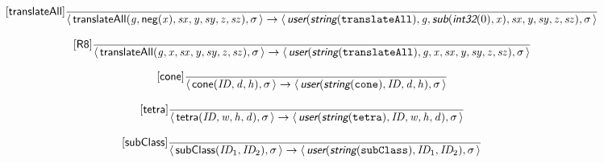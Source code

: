 \documentclass[10pt,leqno]{article}
\newcommand{\artVariable}[1]{\mbox{\em #1\/}}
\newcommand{\artConstructor}[1]{\mbox{\sf #1}}
\newcommand{\artCaseInsensitiveLiteral}[1]{\mbox{\tt #1}}
\newcommand{\artSpecial}[1]{\mbox{\sf\em #1}}
\begin{document}
\begin{equation}
\tag*{[\artConstructor{\sf translateAll}]}\frac{}{\langle\, \artConstructor{\sf translateAll}(\artVariable{g}, \artConstructor{\sf neg}(\artVariable{x}), \artVariable{sx}, \artVariable{y}, \artVariable{sy}, \artVariable{z}, \artVariable{sz}), \artVariable{$\sigma$}\,\rangle \rightarrow \langle\, \artSpecial{user}(\artSpecial{string}(\artCaseInsensitiveLiteral{translateAll}), \artVariable{g}, \artSpecial{sub}(\artSpecial{int32}(0), \artVariable{x}), \artVariable{sx}, \artVariable{y}, \artVariable{sy}, \artVariable{z}, \artVariable{sz}), \artVariable{$\sigma$}\,\rangle }
\end{equation}

\begin{equation}
\tag*{[\artConstructor{\sf R8}]}\frac{}{\langle\, \artConstructor{\sf translateAll}(\artVariable{g}, \artVariable{x}, \artVariable{sx}, \artVariable{y}, \artVariable{sy}, \artVariable{z}, \artVariable{sz}), \artVariable{$\sigma$}\,\rangle \rightarrow \langle\, \artSpecial{user}(\artSpecial{string}(\artCaseInsensitiveLiteral{translateAll}), \artVariable{g}, \artVariable{x}, \artVariable{sx}, \artVariable{y}, \artVariable{sy}, \artVariable{z}, \artVariable{sz}), \artVariable{$\sigma$}\,\rangle }
\end{equation}

\begin{equation}
\tag*{[\artConstructor{\sf cone}]}\frac{}{\langle\, \artConstructor{\sf cone}(\artVariable{ID}, \artVariable{d}, \artVariable{h}), \artVariable{$\sigma$}\,\rangle \rightarrow \langle\, \artSpecial{user}(\artSpecial{string}(\artCaseInsensitiveLiteral{cone}), \artVariable{ID}, \artVariable{d}, \artVariable{h}), \artVariable{$\sigma$}\,\rangle }
\end{equation}

\begin{equation}
\tag*{[\artConstructor{\sf tetra}]}\frac{}{\langle\, \artConstructor{\sf tetra}(\artVariable{ID}, \artVariable{w}, \artVariable{h}, \artVariable{d}), \artVariable{$\sigma$}\,\rangle \rightarrow \langle\, \artSpecial{user}(\artSpecial{string}(\artCaseInsensitiveLiteral{tetra}), \artVariable{ID}, \artVariable{w}, \artVariable{h}, \artVariable{d}), \artVariable{$\sigma$}\,\rangle }
\end{equation}

\begin{equation}
\tag*{[\artConstructor{\sf subClass}]}\frac{}{\langle\, \artConstructor{\sf subClass}(\artVariable{ID$_{1}$}, \artVariable{ID$_{2}$}), \artVariable{$\sigma$}\,\rangle \rightarrow \langle\, \artSpecial{user}(\artSpecial{string}(\artCaseInsensitiveLiteral{subClass}), \artVariable{ID$_{1}$}, \artVariable{ID$_{2}$}), \artVariable{$\sigma$}\,\rangle }
\end{equation}
\end{document}
